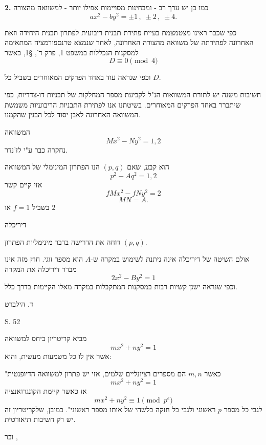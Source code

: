 \medskip
\noindent\textbf{2.} כמו כן יש ערך רב - ומבחינות מסויימות אפילו יותר - למשוואה מהצורה
\[ ax^2 - by^2 = \pm 1 \, , \; \pm 2 \, , \; \pm 4 . \]

כפי שכבר ראינו מצטמצמת בעיית פתירת תבנית ריבועית לפתרון תבנית היחידה וזאת האחרונה לפתירתה של משוואה מהצורה האחרונה, לאחר שנמצא טרנספורמציה המתאימה למסקנות הנכללות במשפט 1, פרק ד', §1, כאשר
\[ D \equiv 0 \pmod{4} \]

וכפי שנראה עוד באחד הפרקים המאוחרים בשביל כל $D$.

חשיבות משנה יש לתורת המשוואות הנ"ל לקביעת מספר המחלקות של תבניות דו-צדדיות, כפי שיתברר באחד הפרקים המאוחרים. בשיטתנו אנו לפתירת התבניות הריבועיות משמשת המשוואה האחרונה לאבן יסוד לכל הבנין שהקמנו.

המשוואה
\[ Mx^2 - Ny^2 = 1, 2 \]
נחקרה כבר ע"י לז'נדר.

הוא קבע, שאם $(p,q)$ הנו הפתרון המינימלי של המשוואה
\[ p^2 - Aq^2 = 1, 2 \]
אזי קיים קשר
\[ fMx^2 - fNy^2 = 2 \]
\[ MN = A . \]
בשביל $f = 1$ או $2$

\medskip
\noindent דיריכלה

\noindent{}

דוחה את הדרישה בדבר מינימליות הפתרון $(p,q)$.

אולם השיטה של דיריכלה אינה ניתנת לשימוש במקרה ש-$A$ הוא מספר זוגי.
חוץ מזה אינו מברר דיריכלה את המקרה
\[ 2x^2 - By^2 = 1 \]
וכפי שנראה ישנן קשיות רבות במסקנות המתקבלות במקרה מאלו הקיימות בדרך כלל.

\medskip
\noindent ד. הילברט

\noindent{}

\begin{center}
S. 52
\end{center}

מביא קריטריון ביחס למשוואה
\[ mx^2 + ny^2 = 1 \]
אשר אין לו כל משמעות מעשית, והוא:

"כאשר $m, n$ הם מספרים רציונליים שלמים, אזי יש פתרון למשוואה הדיופנטית
\[ mx^2 + ny^2 = 1 \]
אז כאשר קיימת הקונגרואנציה
\[ mx^2 + ny^2 \equiv 1 \pmod{p^e} \]
לגבי כל מספר $p$ ראשוני ולגבי כל חזקה כלשהי של אותו מספר ראשוני". כמובן, שלקריטריון זה יש רק חשיבות תיאורטית.

\medskip
\noindent ובר ,

\noindent{}

